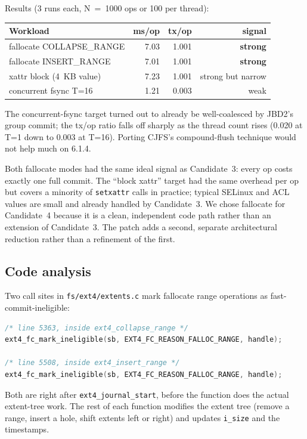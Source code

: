 \documentclass[11pt,a4paper]{article}
\begin{document}
Results (3 runs each, N~=~1000 ops or 100 per thread):

\begin{center}
\begin{tabular}{lrrr}
\toprule
Workload & ms/op & tx/op & signal \\
\midrule
fallocate COLLAPSE\_RANGE   & 7.03 & 1.001 & \textbf{strong} \\
fallocate INSERT\_RANGE     & 7.01 & 1.001 & \textbf{strong} \\
xattr block (4~KB value)    & 7.23 & 1.001 & strong but narrow \\
concurrent fsync T=16       & 1.21 & 0.003 & weak \\
\bottomrule
\end{tabular}
\end{center}

The concurrent-fsync target turned out to already be well-coalesced
by JBD2's group commit; the tx/op ratio falls off sharply as the
thread count rises (0.020 at T=1 down to 0.003 at T=16). Porting
CJFS's compound-flush technique would not help much on 6.1.4.

Both fallocate modes had the same ideal signal as Candidate~3: every
op costs exactly one full commit. The ``block xattr'' target had the
same overhead per op but covers a minority of \texttt{setxattr}
calls in practice; typical SELinux and ACL values are small and
already handled by Candidate~3. We chose fallocate for Candidate~4
because it is a clean, independent code path rather than an
extension of Candidate~3. The patch adds a second, separate
architectural reduction rather than a refinement of the first.

\subsection{Code analysis}

Two call sites in \texttt{fs/ext4/extents.c} mark fallocate range
operations as fast-commit-ineligible:

\begin{lstlisting}[language=C]
/* line 5363, inside ext4_collapse_range */
ext4_fc_mark_ineligible(sb, EXT4_FC_REASON_FALLOC_RANGE, handle);

/* line 5508, inside ext4_insert_range */
ext4_fc_mark_ineligible(sb, EXT4_FC_REASON_FALLOC_RANGE, handle);
\end{lstlisting}

Both are right after \texttt{ext4\_journal\_start}, before the
function does the actual extent-tree work. The rest of each function
modifies the extent tree (remove a range, insert a hole, shift
extents left or right) and updates \texttt{i\_size} and the
timestamps.
\end{document}
